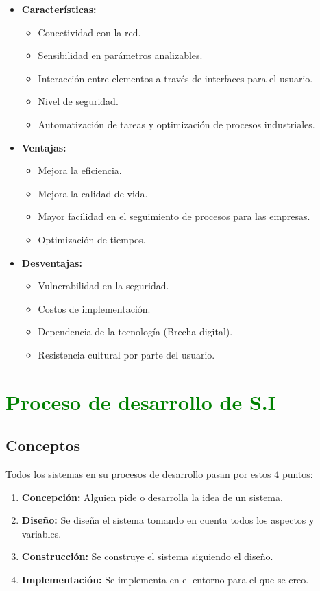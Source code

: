 \documentclass{templateNote}
\begin{document}
\begin{itemize}
    \item \textbf{Características:}
    \begin{itemize}
        \item Conectividad con la red.
        \item Sensibilidad en parámetros analizables.
        \item Interacción entre elementos a través de interfaces para el usuario.
        \item Nivel de seguridad.
        \item Automatización de tareas y optimización de procesos industriales.
    \end{itemize}
    \item \textbf{Ventajas:}
    \begin{itemize}
        \item Mejora la eficiencia.
        \item Mejora la calidad de vida.
        \item Mayor facilidad en el seguimiento de procesos para las empresas.
        \item Optimización de tiempos.
    \end{itemize}
    \item \textbf{Desventajas:}
    \begin{itemize}
        \item Vulnerabilidad en la seguridad.
        \item Costos de implementación.
        \item Dependencia de la tecnología (Brecha digital).
        \item Resistencia cultural por parte del usuario.
    \end{itemize}
\end{itemize}

\newpage


\section{\textcolor{green}{Proceso de desarrollo de S.I}}

\subsection{Conceptos}
\noindent Todos los sistemas en su procesos de desarrollo pasan por estos 4 puntos:
\begin{enumerate}
    \item \textbf{Concepción:} Alguien pide o desarrolla la idea de un sistema.
    \item \textbf{Diseño:} Se diseña el sistema tomando en cuenta todos los aspectos y variables.
    \item \textbf{Construcción:} Se construye el sistema siguiendo el diseño.
    \item \textbf{Implementación:} Se implementa en el entorno para el que se creo.
\end{enumerate}
\end{document}

